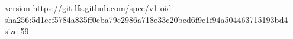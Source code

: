 version https://git-lfs.github.com/spec/v1
oid sha256:5d1cef5784a835ff0cba79c2986a718e33c20bcd6f9c1f94a504463715193bd4
size 59
